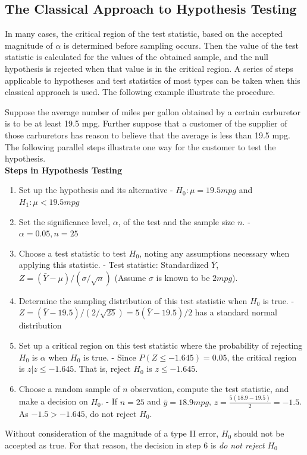 \documentclass{WileySev}
\newcommand{\myexample}[2]{
    \begin{tcolorbox}[enhanced,colback=black!5!white,colframe=black,sharp corners,title={Example: #1}]#2
    \end{tcolorbox}
}
\begin{document}
\subsection{The Classical Approach to Hypothesis Testing}

In many cases, the critical region of the test statistic, based on the accepted magnitude of $\alpha$ is determined before sampling occurs. Then the value of the test statistic is calculated for the values of the obtained sample, and the null hypothesis is rejected when that value is in the critical region. A series of steps applicable to hypotheses and test statistics of most types can be taken when this classical approach is used. The following example illustrate the procedure.
\
\myexample{Classical Approach to Hypothesis Testing}{Suppose the average number of miles per gallon obtained by a certain carburetor is to be at least 19.5 mpg. Further suppose that a customer of the supplier of those carburetors has reason to believe that the average is less than 19.5 mpg. The following parallel steps illustrate one way for the customer to test the hypothesis.
\\
\textbf{Steps in Hypothesis Testing}
\begin{enumerate}
	\item Set up the hypothesis and its alternative - $H_0:\mu = 19.5 mpg$ and $H_1:\mu < 19.5 mpg$
	\item Set the significance level, $\alpha$, of the test and the sample size $n$. - $\alpha = 0.05, n = 25$
	\item Choose a test statistic to test $H_0$, noting any assumptions necessary when applying this statistic. - Test statistic: Standardized $\bar{Y}$, $Z=(\bar{Y}-\mu)/(\sigma/\sqrt{n})$ (Assume $\sigma$ is known to be $2 mpg$).
	\item Determine the sampling distribution of this test statistic when $H_0$ is true. - $Z=(\bar{Y}-19.5)/(2/\sqrt{25}) = 5(\bar{Y}-19.5)/2$ has a standard normal distribution
	\item Set up a critical region on this test statistic where the probability of rejecting $H_0$ is $\alpha$ when $H_0$ is true. - Since $P(Z \leq -1.645) = 0.05$, the critical region is ${z|z \leq -1.645}$. That is, reject $H_0$ is $z \leq -1.645$.
	\item Choose a random sample of $n$ observation, compute the test statistic, and make a decision on $H_0$. - If $n = 25$ and $\bar{y} = 18.9mpg$,
	$z=\frac{5(18.9-19.5)}{2}=-1.5$. As $-1.5 > -1.645$, do not reject $H_0$.
\end{enumerate}
Without consideration of the magnitude of a type II error, $H_0$ should not be accepted as true. For that reason, the decision in step 6 is \textit{do not reject} $H_0$}
\end{document}
